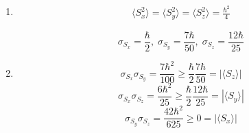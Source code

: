 \begin{enumerate}
\begin{align*}
\begin{pmatrix}
               -4i \\ -3
           \end{pmatrix}\\
           =&\frac{-12\hbar}{25}
       \end{align*}
       \begin{align*}
           \langle S_z\rangle
           =&\frac{1}{25}
           \frac{\hbar}{2}
           \begin{pmatrix}
               -3i & 4
           \end{pmatrix}
           \begin{pmatrix}
               1 & 0 \\
               0 & -1
           \end{pmatrix}
           \begin{pmatrix}
               3i\\4
           \end{pmatrix}\\
           =& \frac{\hbar}{50}
           \begin{pmatrix}
               -3i & 4
           \end{pmatrix}
           \begin{pmatrix}
               3i \\ -4
           \end{pmatrix}\\
           =&\frac{-7\hbar}{50}
       \end{align*}
       \item 

        \begin{align*}
           \langle S^2_x\rangle
           =
           \langle S^2_y\rangle
           =
           \langle S^2_z\rangle
           =
           \frac{\hbar^2}{4}
       \end{align*}

       $$
       \sigma_{S_x}
       =\frac{\hbar}{2},\;
       \sigma_{S_y}
       =\frac{7\hbar}{50},\;
       \sigma_{S_z}
       =\frac{12\hbar}{25}
       $$
       \item 
       $$
       \sigma_{S_x}\sigma_{S_y}
       =\frac{7\hbar^2}{100}\geq 
       \frac{\hbar}{2}\frac{7\hbar}{50}=|\langle S_z\rangle|
       $$
       $$
       \sigma_{S_x}\sigma_{S_z}
       =\frac{6\hbar^2}{25}\geq 
       \frac{\hbar}{2}\frac{12\hbar}{25}=|\langle S_y\rangle|
       $$
       $$
       \sigma_{S_y}\sigma_{S_z}
       =\frac{42\hbar^2}{625}\geq 
       0=|\langle S_x\rangle|
       $$
   \end{enumerate}

